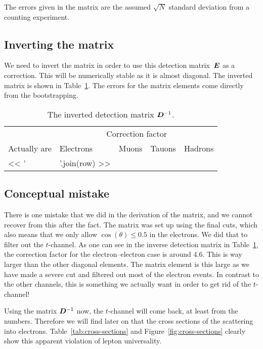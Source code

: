 \documentclass[11pt, english, fleqn, DIV=15, headinclude, BCOR=2cm]{scrreprt}
\begin{document}
The errors given in the matrix are the assumed $\sqrt N$ standard deviation
from a counting experiment.

\subsection{Inverting the matrix}

We need to invert the matrix in order to use this detection matrix~$\mat E$ as
a correction. This will be numerically stable as it is almost diagonal. The
inverted matrix is shown in Table~\ref{tab:inverted}. The errors for the matrix
elements come directly from the bootstrapping.

\begin{table}
    \centering
    \begin{tabular}{lllll}
        \toprule
        & \multicolumn{4}{c}{Correction factor} \\
        \cmidrule(l){2-5}
        {Actually are}
        & {Electrons}
        & {Muons}
        & {Tauons}
        & {Hadrons} \\
        \midrule
        << ' & '.join(row) >> \\
        \bottomrule
    \end{tabular}
    \caption{%
        The inverted detection matrix $\mat D\inv$.
    }
    \label{tab:inverted}
\end{table}

\subsection{Conceptual mistake}

There is one mistake that we did in the derivation of the matrix, and we cannot
recover from this after the fact. The matrix was set up using the final cuts,
which also means that we only allow $\cos(\theta) \leq \num{0.5}$ in the
electrons. We did that to filter out the $t$-channel. As one can see in the
inverse detection matrix in Table~\ref{tab:inverted}, the correction factor for
the electron--electron case is around \num{4.6}. This is way larger than the
other diagonal elements. The matrix element is this large as we have made a
severe cut and filtered out most of the electron events. In contrast to the
other channels, this is something we actually want in order to get rid of the
$t$-channel!

Using the matrix $\mat D\inv$ now, the $t$-channel will come back, at least
from the numbers. Therefore we will find later on that the cross sections of
the scattering into electrons. Table~\ref{tab:cross-sections} and
Figure~\ref{fig:cross-sections} clearly show this apparent violation of lepton
universality.
\end{document}

